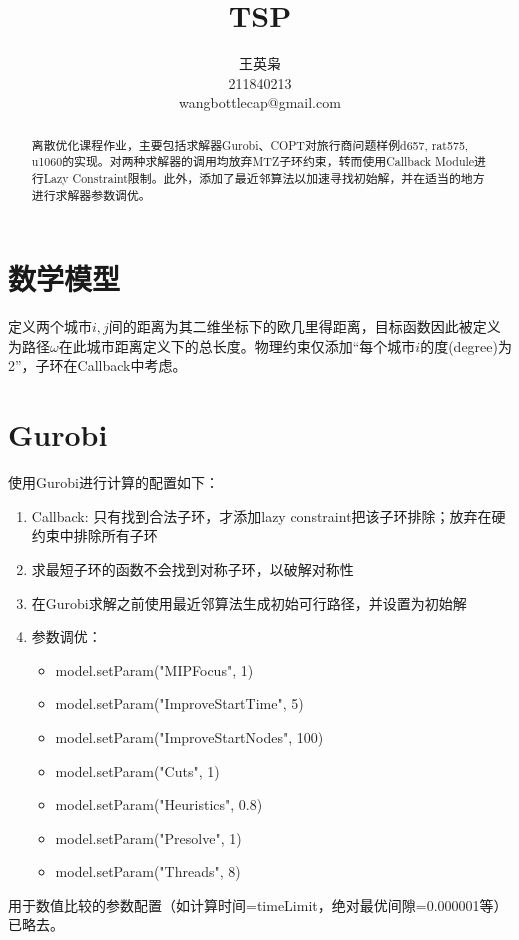 \documentclass[12pt]{article}  %
\title{{TSP}}
\author{王英枭 \\
          211840213\\
         {\small wangbottlecap@gmail.com}}
\begin{document}
\maketitle

\begin{abstract}
离散优化课程作业，主要包括求解器Gurobi、COPT对旅行商问题样例d657, rat575, u1060的实现。对两种求解器的调用均放弃MTZ子环约束，转而使用Callback Module进行Lazy Constraint限制。此外，添加了最近邻算法以加速寻找初始解，并在适当的地方进行求解器参数调优。
\end{abstract}

\tableofcontents
\section{数学模型}
定义两个城市$i, j$间的距离为其二维坐标下的欧几里得距离，目标函数因此被定义为路径$\omega$在此城市距离定义下的总长度。物理约束仅添加``每个城市$i$的度(degree)为2''，子环在Callback中考虑。

\section{Gurobi}
使用Gurobi进行计算的配置如下：
\begin{enumerate}
    \item Callback: 只有找到合法子环，才添加lazy constraint把该子环排除；放弃在硬约束中排除所有子环
    \item 求最短子环的函数不会找到对称子环，以破解对称性
    \item 在Gurobi求解之前使用最近邻算法生成初始可行路径，并设置为初始解
    \item 参数调优：
    \begin{itemize}
        \item model.setParam("MIPFocus", 1)
        \item model.setParam("ImproveStartTime", 5)
        \item model.setParam("ImproveStartNodes", 100)
        \item model.setParam("Cuts", 1)
        \item model.setParam("Heuristics", 0.8)
        \item model.setParam("Presolve", 1)
        \item model.setParam("Threads", 8)
    \end{itemize}
\end{enumerate}
用于数值比较的参数配置（如计算时间=timeLimit，绝对最优间隙=0.000001等）已略去。
\end{document}

